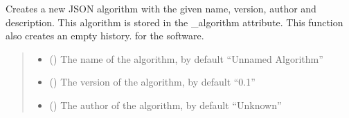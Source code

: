 \documentclass[letterpaper,10pt,english]{sphinxmanual}
\begin{document}
\begin{fulllineitems}
\begin{fulllineitems}
\label{\detokenize{source/_autosummary/HDF5_BLS_treat.Treat_backend:HDF5_BLS_treat.Treat_backend.silent_create_algorithm}}
\pysigstartsignatures
\pysiglinewithargsret
{}
{\sphinxparamcomma {}\sphinxparamcomma {}\sphinxparamcomma {}\sphinxparamcomma {}}
{}
\pysigstopsignatures
\sphinxAtStartPar
Creates a new JSON algorithm with the given name, version, author and description. This algorithm is stored in the \_algorithm attribute. This function also creates an empty history. for the software.
\begin{quote}\begin{description}
\begin{itemize}
\item {} 
\sphinxAtStartPar
{} (\sphinxstyleliteralemphasis{\sphinxupquote{, }}) \textendash{} The name of the algorithm, by default “Unnamed Algorithm”

\item {} 
\sphinxAtStartPar
{} (\sphinxstyleliteralemphasis{\sphinxupquote{, }}) \textendash{} The version of the algorithm, by default “0.1”

\item {} 
\sphinxAtStartPar
{} (\sphinxstyleliteralemphasis{\sphinxupquote{, }}) \textendash{} The author of the algorithm, by default “Unknown”


\end{itemize}
\end{description}
\end{quote}
\end{fulllineitems}
\end{fulllineitems}
\end{document}
